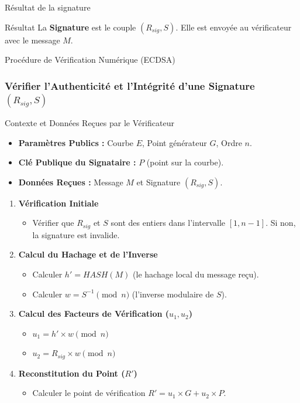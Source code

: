 \begin{frame}{Résultat de la signature}
\begin{alertblock}{Résultat}
    La \textbf{Signature} est le couple $(R_{sig}, S)$. Elle est envoyée au vérificateur avec le message $M$.
\end{alertblock}
\end{frame}

\begin{frame}{Procédure de Vérification Numérique (ECDSA)}
\frametitle{Vérifier l'Authenticité et l'Intégrité d'une Signature $(R_{sig}, S)$}

\begin{block}{Contexte et Données Reçues par le Vérificateur}
    \begin{itemize}
        \item \textbf{Paramètres Publics :} Courbe $E$, Point générateur $G$, Ordre $n$.
        \item \textbf{Clé Publique du Signataire :} $P$ (point sur la courbe).
        \item \textbf{Données Reçues :} Message $M$ et Signature $(R_{sig}, S)$.
    \end{itemize}
\end{block}

\vspace{0.2cm}

\begin{enumerate}
    \item \textbf{Vérification Initiale}
    \begin{itemize}
        \item Vérifier que $R_{sig}$ et $S$ sont des entiers dans l'intervalle $[1, n-1]$. Si non, la signature est invalide.
    \end{itemize}
    
    \item \textbf{Calcul du Hachage et de l'Inverse}
    \begin{itemize}
        \item Calculer $h' = HASH(M)$ (le hachage local du message reçu).
        \item Calculer $w = S^{-1} \pmod n$ (l'inverse modulaire de $S$).
    \end{itemize}
    
    \item \textbf{Calcul des Facteurs de Vérification ($u_1, u_2$)}
    \begin{itemize}
        \item $u_1 = h' \times w \pmod n$
        \item $u_2 = R_{sig} \times w \pmod n$
    \end{itemize}
    
    \item \textbf{Reconstitution du Point ($R'$)}
    \begin{itemize}
        \item Calculer le point de vérification $R' = u_1 \times G + u_2 \times P$.
    \end{itemize}
\end{enumerate}

\end{frame}


